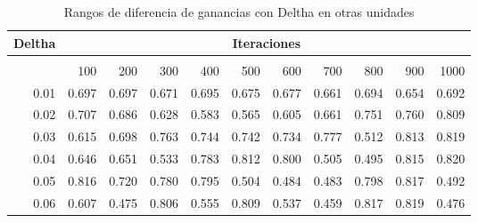 \begin{table}[H]
\small

\caption{Rangos de diferencia de ganancias con Deltha en otras unidades}
\begin{tabular}{rrrrrrrrrrr} 
\multicolumn{1}{l}{Deltha} & \multicolumn{10}{c}{Iteraciones}      \\ \hline                                                                                                                                                                                              \\
\multicolumn{1}{l}{}       & 100                  & 200                  & 300                  & 400                  & 500                  & 600                  & 700                  & 800                  & 900                  & 1000                 \\
0.01                       & 0.697                & 0.697                & 0.671                & 0.695                & 0.675                & 0.677                & 0.661                & 0.694                & 0.654                & 0.692                \\
0.02                       & 0.707                & 0.686                & 0.628                & 0.583                & 0.565                & 0.605                & 0.661                & 0.751                & 0.760                & 0.809                \\
0.03                       & 0.615                & 0.698                & 0.763                & 0.744                & 0.742                & 0.734                & 0.777                & 0.512                & 0.813                & 0.819                \\
0.04                       & 0.646                & 0.651                & 0.533                & 0.783                & 0.812                & 0.800                & 0.505                & 0.495                & 0.815                & 0.820                \\
0.05                       & 0.816                & 0.720                & 0.780                & 0.795                & 0.504                & 0.484                & 0.483                & 0.798                & 0.817                & 0.492                \\
0.06                       & 0.607                & 0.475                & 0.806                & 0.555                & 0.809                & 0.537                & 0.459                & 0.817                & 0.819                & 0.476                \\

\end{tabular}
\end{table}
